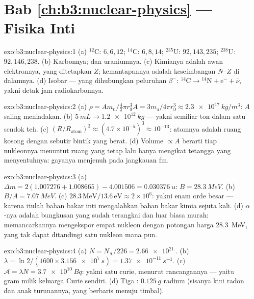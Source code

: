 \section*{Bab \ref{ch:b3:nuclear-physics} --- Fisika Inti}

\begin{solution}{exo:b3:nuclear-physics:1}
(a) $^{12}$C: $6, 6, 12$; $^{14}$C: $6, 8, 14$; $^{235}$U:
$92, 143, 235$; $^{238}$U: $92, 146, 238$. (b) Karbonnya; dan
uraniumnya. (c) Kimianya adalah awan elektronnya, yang ditetapkan $Z$;
kemantapannya adalah keseimbangan $N$--$Z$ di dalamnya. (d) Isobar ---
yang dihubungkan peluruhan $\beta^-$: $^{14}\text{C} \to {}^{14}\text{N}
+ \text{e}^- + \bar\nu$, yakni detak jam radiokarbonnya.
\end{solution}

\begin{solution}{exo:b3:nuclear-physics:2}
(a) $\rho = Am_{\text{u}}/\tfrac43\pi r_0^3A =
3m_{\text{u}}/4\pi r_0^3 \approx \qty{2.3e17}{kg/m^3}$: $A$
saling meniadakan. (b) $\qty{5}{mL} \to \qty{1.2e12}{kg}$ --- yakni semiliar
ton dalam satu sendok teh. (c) $(R/R_{\text{atom}})^3 \approx
(4.7\times10^{-5})^3 \approx 10^{-13}$: atomnya adalah ruang kosong
dengan sebutir bintik yang berat. (d) Volume $\propto A$ berarti tiap nukleonnya
menuntut ruang yang tetap lalu hanya mengikat tetangga yang menyentuhnya: gayanya
menjenuh pada jangkauan \unit{fm}.
\end{solution}

\begin{solution}{exo:b3:nuclear-physics:3}
(a) $\Delta m = 2(1.007276 + 1.008665) - 4.001506 =
\qty{0.030376}{u}$: $B = \qty{28.3}{MeV}$. (b) $B/A =
\qty{7.07}{MeV}$. (c) $28.3\,\text{MeV}/13.6\,\text{eV} \approx
2\times10^6$: yakni enam orde besar --- karena itulah bahan bakar inti
mengalahkan bahan bakar kimia sejuta kali. (d) $\alpha$-nya adalah
bungkusan yang sudah terangkai dan luar biasa murah: memancarkannya
mengekspor empat nukleon dengan potongan harga \qty{28.3}{MeV}, yang tak
dapat ditandingi satu nukleon mana pun.
\end{solution}

\begin{solution}{exo:b3:nuclear-physics:4}
(a) $N = N_{\text{A}}/226 = \qty{2.66e21}{}$. (b) $\lambda =
\ln2/(1600\times\qty{3.156e7}{s}) = \qty{1.37e-11}{s^{-1}}$. (c)
$\mathcal A = \lambda N = \qty{3.7e10}{Bq}$: yakni satu curie, menurut
rancangannya --- yaitu gram milik keluarga Curie sendiri. (d) Tiga :
$\qty{0.125}{g}$ radium (sisanya kini radon dan
anak turunannya, yang berbaris menuju timbal).
\end{solution}


